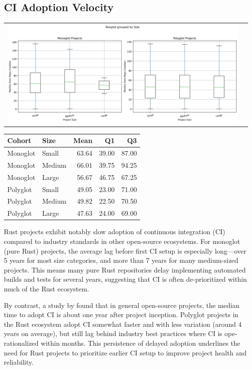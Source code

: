 \documentclass[11pt]{article}
\begin{document}
\subsection{CI Adoption Velocity}
\begin{tabularx}{\linewidth}{@{}XX@{}}
\includegraphics[width=\linewidth]{figures/time_to_ci.jpg}
\end{tabularx}
\begin{center}
\begin{tabular}{llrrr}
Cohort & Size & Mean & Q1 & Q3\\
\hline
Monoglot & Small & 63.64 & 39.00 & 87.00\\
Monoglot & Medium & 66.01 & 39.75 & 94.25\\
Monoglot & Large & 56.67 & 46.75 & 67.25\\
Polyglot & Small & 49.05 & 23.00 & 71.00\\
Polyglot & Medium & 49.82 & 22.50 & 70.50\\
Polyglot & Large & 47.63 & 24.00 & 69.00\\
\end{tabular}
\end{center}
Rust projects exhibit notably slow adoption of continuous integration (CI) compared to industry standards in other open-source ecosystems. For monoglot (pure Rust) projects, the average lag before first CI setup is especially long—over 5 years for most size categories, and more than 7 years for many medium-sized projects. This means many pure Rust repositories delay implementing automated builds and tests for several years, suggesting that CI is often de-prioritized within much of the Rust ecosystem.

By contrast, a study by \autocite{Hilton2016} found that in general open-source projects, the median time to adopt CI is about one year after project inception. Polyglot projects in the Rust ecosystem adopt CI somewhat faster and with less variation (around 4 years on average), but still lag behind industry best practices where CI is ope-rationalized within months. This persistence of delayed adoption underlines the need for Rust projects to prioritize earlier CI setup to improve project health and reliability.
\end{document}
